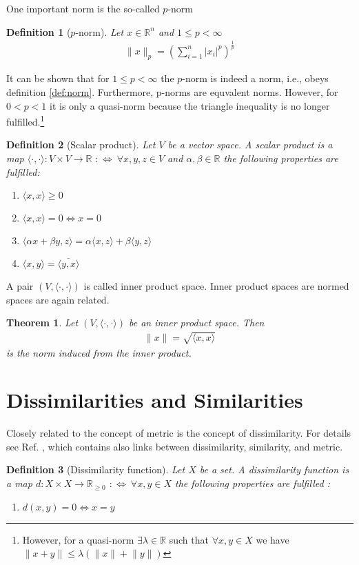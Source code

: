 \documentclass[10pt,a4paper]{article}
\newtheorem{theorem}{Theorem}
\newtheorem{definition}{Definition}
\begin{document}
One important norm is the so-called $p$-norm
\begin{definition}[$p$-norm] Let $x\in \mathbb R ^n$ and $1\leq p < \infty$
\begin{align}\label{eq:p-norm}
\lVert x \rVert_p = \left(\sum_{i=1}^n \lvert x_i \rvert ^p \right)^{\frac{1}{p}}
\end{align}
\end{definition}
It can be shown that for $1\leq p < \infty$ the $p$-norm is indeed a norm,
i.e., obeys definition \ref{def:norm}. Furthermore, p-norms are equvalent norms.  However, for $0<p<1$ it is only a quasi-norm because the triangle inequality is no longer fulfilled.\footnote{However, for a quasi-norm  $\exists \lambda \in \mathbb R$ such that $\forall x, y \in X$ we have $\lVert x + y \rVert \leq \lambda \left ( \lVert x \rVert + \lVert  y\rVert \right)$  }


\begin{definition}[Scalar product]
Let $V$ be a vector space. A  scalar product is a map $\langle \cdot, \cdot \rangle: V \times V \rightarrow \mathbb R$   $:\Leftrightarrow~\forall x,y,z \in V$ and $\alpha, \beta \in \mathbb R$ the following properties are fulfilled:
\begin{enumerate}
\item $\langle x,x \rangle \geq 0$
\item $\langle x,x \rangle  = 0  \Leftrightarrow x=0$
\item $\langle \alpha x + \beta y, z \rangle = \alpha \langle x,z \rangle +  
 \beta \langle y,z \rangle$
\item $\langle x, y \rangle = \bar{\langle y, x \rangle }$
\end{enumerate}
\end{definition}
A pair $(V, \langle \cdot, \cdot \rangle)$ is called inner product space. Inner product spaces are normed spaces are again related.
\begin{theorem}
Let  $(V, \langle \cdot, \cdot \rangle)$ be an inner product space. Then
\begin{align}
\lVert x \rVert = \sqrt{\langle x,x \rangle}
\end{align}
is the norm induced from the inner product.
\end{theorem}

\section{Dissimilarities and Similarities}
Closely related to the concept of metric is the concept of dissimilarity. For details see Ref. \cite{vonLuxburg2004}, which contains also links between dissimilarity, similarity, and metric.
\begin{definition}[Dissimilarity function] Let $X$ be a set. A dissimilarity function is a map $d: X \times X \rightarrow \mathbb R_{\geq 0}$   $:\Leftrightarrow~\forall x,y \in X$ the following properties are fulfilled  \cite{vonLuxburg2004}:
\begin{enumerate}
\item $d(x,y) = 0 \Leftrightarrow x=y$ 
\end{enumerate}
\end{definition}
\end{document}
